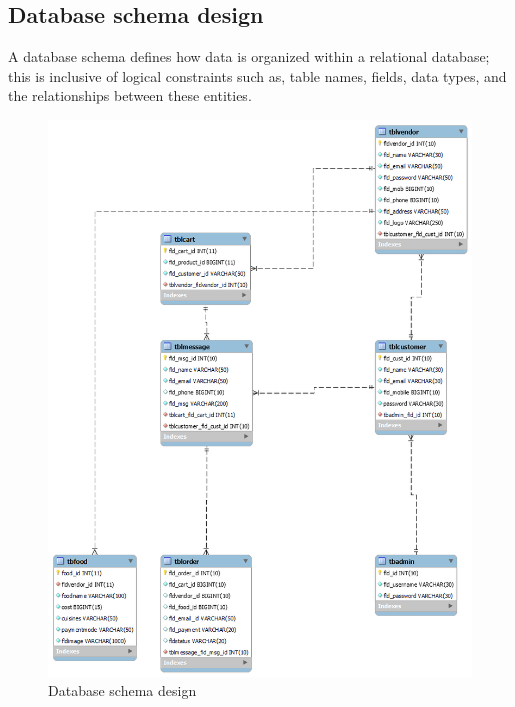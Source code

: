 \subsection{Database schema design}
A database schema defines how data is organized within a relational database; this is inclusive of logical constraints such as, table names, fields, data types, and the relationships between these entities. 
\begin{figure}[h]
    \centering
    \includegraphics[scale=0.4]{img/Graphics/database.png}
    \caption{Database schema design}
\end{figure}
